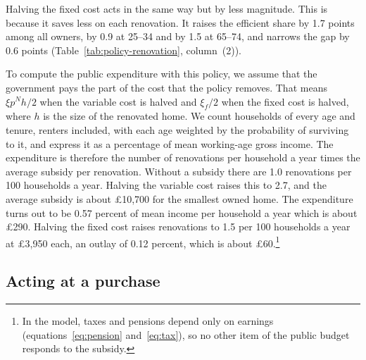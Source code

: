 Halving the fixed cost acts in the same way but by less magnitude. This is  because it
saves less on each renovation. It raises the efficient share by 1.7 points
among all owners, by 0.9 at 25--34 and by 1.5 at 65--74, and narrows the
gap by 0.6 points (Table~\ref{tab:policy-renovation}, column~(2)).

To compute the public expenditure with this policy, we assume that the government pays the part of the cost that the
policy removes. That means $\xi p^N h/2$ when the variable cost is halved and
$\xi_f/2$ when the fixed cost is halved, where $h$ is the size of the
renovated home. We count households of every age and tenure, renters
included, with each age weighted by the probability of surviving to it, and
 express it as a percentage of mean working-age gross income. The expenditure is therefore the number of renovations per
household a year times the average subsidy per renovation. Without a
subsidy there are 1.0 renovations per 100 households a year. Halving the
variable cost raises this to 2.7, and the average subsidy is about
\pounds10,700 for the smallest owned home. The expenditure turns out to be 0.57 percent of
mean income per household a year which is about \pounds290. Halving the fixed cost
raises renovations to 1.5 per 100 households a year at \pounds3,950 each,
an outlay of 0.12 percent, which is about \pounds60.\footnote{ In the model, taxes and pensions
depend only on earnings (equations~\eqref{eq:pension} and~\eqref{eq:tax}),
so no other item of the public budget responds to the subsidy.}


\subsection{Acting at a purchase}\label{sec:policy-purchase}

